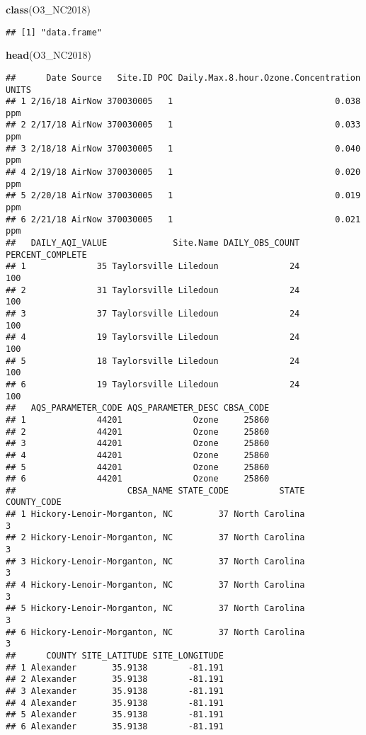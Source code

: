 \documentclass[]{article}
\newenvironment{Shaded}{\begin{snugshade}}{\end{snugshade}}
\newcommand{\KeywordTok}[1]{\textcolor[rgb]{0.13,0.29,0.53}{\textbf{#1}}}
\newcommand{\NormalTok}[1]{#1}
\begin{document}
\begin{Shaded}
\begin{Highlighting}[]
\KeywordTok{class}\NormalTok{(O3_NC2018)}
\end{Highlighting}
\end{Shaded}

\begin{verbatim}
## [1] "data.frame"
\end{verbatim}

\begin{Shaded}
\begin{Highlighting}[]
\KeywordTok{head}\NormalTok{(O3_NC2018)}
\end{Highlighting}
\end{Shaded}

\begin{verbatim}
##      Date Source   Site.ID POC Daily.Max.8.hour.Ozone.Concentration UNITS
## 1 2/16/18 AirNow 370030005   1                                0.038   ppm
## 2 2/17/18 AirNow 370030005   1                                0.033   ppm
## 3 2/18/18 AirNow 370030005   1                                0.040   ppm
## 4 2/19/18 AirNow 370030005   1                                0.020   ppm
## 5 2/20/18 AirNow 370030005   1                                0.019   ppm
## 6 2/21/18 AirNow 370030005   1                                0.021   ppm
##   DAILY_AQI_VALUE             Site.Name DAILY_OBS_COUNT PERCENT_COMPLETE
## 1              35 Taylorsville Liledoun              24              100
## 2              31 Taylorsville Liledoun              24              100
## 3              37 Taylorsville Liledoun              24              100
## 4              19 Taylorsville Liledoun              24              100
## 5              18 Taylorsville Liledoun              24              100
## 6              19 Taylorsville Liledoun              24              100
##   AQS_PARAMETER_CODE AQS_PARAMETER_DESC CBSA_CODE
## 1              44201              Ozone     25860
## 2              44201              Ozone     25860
## 3              44201              Ozone     25860
## 4              44201              Ozone     25860
## 5              44201              Ozone     25860
## 6              44201              Ozone     25860
##                      CBSA_NAME STATE_CODE          STATE COUNTY_CODE
## 1 Hickory-Lenoir-Morganton, NC         37 North Carolina           3
## 2 Hickory-Lenoir-Morganton, NC         37 North Carolina           3
## 3 Hickory-Lenoir-Morganton, NC         37 North Carolina           3
## 4 Hickory-Lenoir-Morganton, NC         37 North Carolina           3
## 5 Hickory-Lenoir-Morganton, NC         37 North Carolina           3
## 6 Hickory-Lenoir-Morganton, NC         37 North Carolina           3
##      COUNTY SITE_LATITUDE SITE_LONGITUDE
## 1 Alexander       35.9138        -81.191
## 2 Alexander       35.9138        -81.191
## 3 Alexander       35.9138        -81.191
## 4 Alexander       35.9138        -81.191
## 5 Alexander       35.9138        -81.191
## 6 Alexander       35.9138        -81.191
\end{verbatim}
\end{document}
